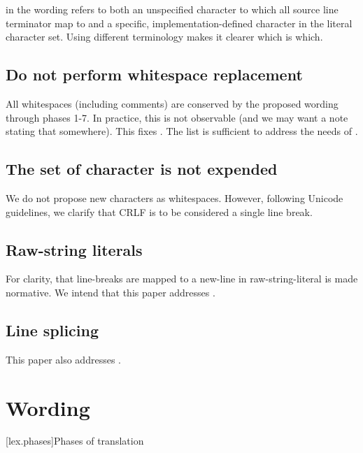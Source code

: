 \documentclass{wg21}
\begin{document}
 in the wording refers to both an unspecified character to which all source line terminator map to and
a specific, implementation-defined character in the literal character set.
Using different terminology makes it clearer which is which.

\subsection{Do not perform whitespace replacement}

All whitespaces (including comments) are conserved by the proposed wording through phases 1-7.
In practice, this is not observable (and we may want a note stating that somewhere).
This fixes . The list is sufficient to address the needs of .

\subsection{The set of character is not expended}

We do not propose new characters as whitespaces.
However, following Unicode guidelines, we clarify that CRLF is to be considered a single line break.

\subsection{Raw-string literals}

For clarity, that line-breaks are mapped to a new-line in raw-string-literal is made normative.
We intend that this paper addresses .

\subsection{Line splicing}

This paper also addresses .

\section{Wording}
[lex.phases]{Phases of translation}%
\end{document}
